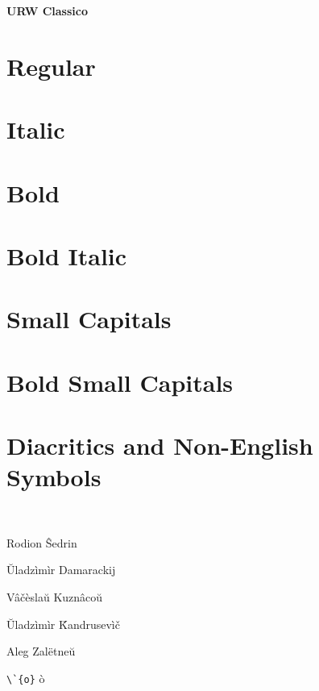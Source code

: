 \documentclass{article}
\begin{document}
\begin{center}\huge\bf URW Classico
\end{center}


\section*{Regular}
\lipsum[1]

\section*{Italic}
\textit{\lipsum[2]}

\section*{Bold}

\textbf{\lipsum[3]}

\section*{Bold Italic}

\textbf{\textit{\lipsum[4]}}

\section*{Small Capitals}

\textsc{\lipsum[5]}


\section*{Bold Small Capitals}

\textbf{\textsc{\lipsum[6]}}

\clearpage

\section*{Diacritics and Non-English Symbols}

\ \par


Rodion \^{S}edrin 

\u{U}ladz\`{i}m\`{i}r Damarackij

V\^{a}\v{c}\`{e}sla\u{u} Kuzn\^{a}co\u{u}

\u{U}ladz\`{i}m\`{i}r \v{K}andrusev\`{i}\v{c}

Aleg Zal\"{e}tne\u{u}

\verb|\`{o}|  \`{o}
\end{document}
